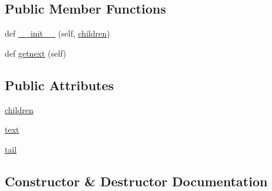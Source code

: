 \subsection*{Public Member Functions}
\begin{DoxyCompactItemize}
\item 
def \hyperlink{classpip_1_1__vendor_1_1html5lib_1_1treewalkers_1_1etree__lxml_1_1FragmentRoot_a6d9bf5a6d825f9540c3c9767702de82e}{\+\_\+\+\_\+init\+\_\+\+\_\+} (self, \hyperlink{classpip_1_1__vendor_1_1html5lib_1_1treewalkers_1_1etree__lxml_1_1FragmentRoot_ae905a2f86709165eba5530ce3ff51a3a}{children})
\item 
def \hyperlink{classpip_1_1__vendor_1_1html5lib_1_1treewalkers_1_1etree__lxml_1_1FragmentRoot_a945518b43df0446cc3ff18a52127c735}{getnext} (self)
\end{DoxyCompactItemize}
\subsection*{Public Attributes}
\begin{DoxyCompactItemize}
\item 
\hyperlink{classpip_1_1__vendor_1_1html5lib_1_1treewalkers_1_1etree__lxml_1_1FragmentRoot_ae905a2f86709165eba5530ce3ff51a3a}{children}
\item 
\hyperlink{classpip_1_1__vendor_1_1html5lib_1_1treewalkers_1_1etree__lxml_1_1FragmentRoot_a8d4b9686ff881e7fa26aaecbc3cd0ed5}{text}
\item 
\hyperlink{classpip_1_1__vendor_1_1html5lib_1_1treewalkers_1_1etree__lxml_1_1FragmentRoot_a0169e8f7aa8abeff6d4cf35486a6927d}{tail}
\end{DoxyCompactItemize}


\subsection{Constructor \& Destructor Documentation}
\mbox{\label{classpip_1_1__vendor_1_1html5lib_1_1treewalkers_1_1etree__lxml_1_1FragmentRoot_a6d9bf5a6d825f9540c3c9767702de82e}} 
